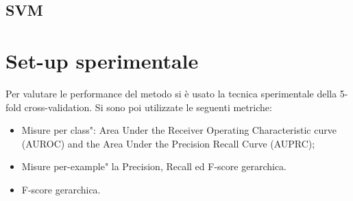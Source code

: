 \documentclass{article}
\begin{document}
\subsection{SVM}


\section{Set-up sperimentale}

Per valutare le performance del metodo si è usato la tecnica sperimentale della 5-fold
cross-validation.  Si sono poi utilizzate le seguenti metriche:

\begin{itemize}
\item Misure per  class":   Area  Under  the  Receiver  Operating  Characteristic
curve (AUROC) and the Area Under the Precision Recall Curve (AUPRC);
\item Misure per-example" la Precision, Recall ed F-score gerarchica.
\item F-score gerarchica.
\end{itemize}








\end{document}
